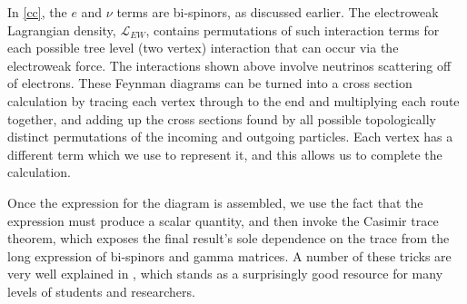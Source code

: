 In \autoref{cc}, the $e$ and $\nu$ terms are bi-spinors, as discussed earlier. The electroweak Lagrangian density, $\mathscr{L}_{EW}$, contains permutations of such interaction terms for each possible tree level (two vertex) interaction that can occur via the electroweak force. The interactions shown above involve neutrinos scattering off of electrons. These Feynman diagrams can be turned into a cross section calculation by tracing each vertex through to the end and multiplying each route together, and adding up the cross sections found by all possible topologically distinct permutations of the incoming and outgoing particles. Each vertex has a different term which we use to represent it, and this allows us to complete the calculation.

Once the expression for the diagram is assembled, we use the fact that the expression must produce a scalar quantity, and then invoke the Casimir trace theorem, which exposes the final result's sole dependence on the trace from the long expression of bi-spinors and gamma matrices. A number of these tricks are very well explained in \textcite{elempart}, which stands as a surprisingly good resource for many levels of students and researchers. 

